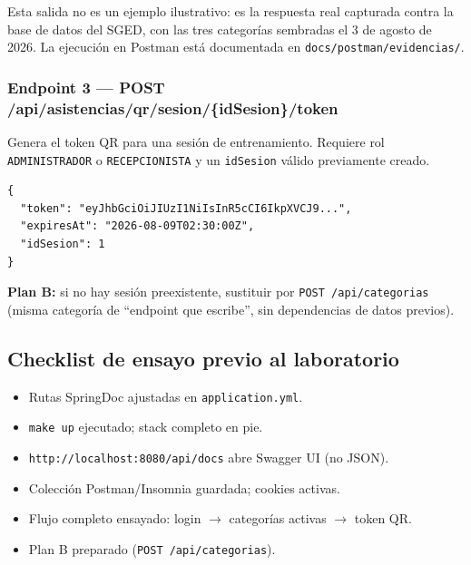 \documentclass[12pt,a4paper]{article}
\begin{document}
Esta salida no es un ejemplo ilustrativo: es la respuesta real capturada contra la base de
datos del SGED, con las tres categorías sembradas el 3 de agosto de 2026. La ejecución en
Postman está documentada en \texttt{docs/postman/evidencias/}.

\subsubsection{Endpoint 3 --- POST /api/asistencias/qr/sesion/\{idSesion\}/token}

Genera el token QR para una sesión de entrenamiento.
Requiere rol \texttt{ADMINISTRADOR} o \texttt{RECEPCIONISTA} y un \texttt{idSesion}
válido previamente creado.

\begin{lstlisting}[style=json, caption={Response --- POST /api/asistencias/qr/sesion/1/token}]
{
  "token": "eyJhbGciOiJIUzI1NiIsInR5cCI6IkpXVCJ9...",
  "expiresAt": "2026-08-09T02:30:00Z",
  "idSesion": 1
}
\end{lstlisting}

\textbf{Plan B:} si no hay sesión preexistente, sustituir por \texttt{POST /api/categorias}
(misma categoría de ``endpoint que escribe'', sin dependencias de datos previos).

\subsection{Checklist de ensayo previo al laboratorio}

\begin{tcolorbox}[colback=NavyBlue!5, colframe=NavyBlue!60,
  title=Checklist --- Demo API REST en vivo]
  \begin{itemize}
    \item[$\square$] Rutas SpringDoc ajustadas en \texttt{application.yml}.
    \item[$\square$] \texttt{make up} ejecutado; stack completo en pie.
    \item[$\square$] \texttt{http://localhost:8080/api/docs} abre Swagger UI (no JSON).
    \item[$\square$] Colección Postman/Insomnia guardada; cookies activas.
    \item[$\square$] Flujo completo ensayado: login $\to$ categorías activas $\to$ token QR.
    \item[$\square$] Plan B preparado (\texttt{POST /api/categorias}).
  \end{itemize}
\end{tcolorbox}
\end{document}
